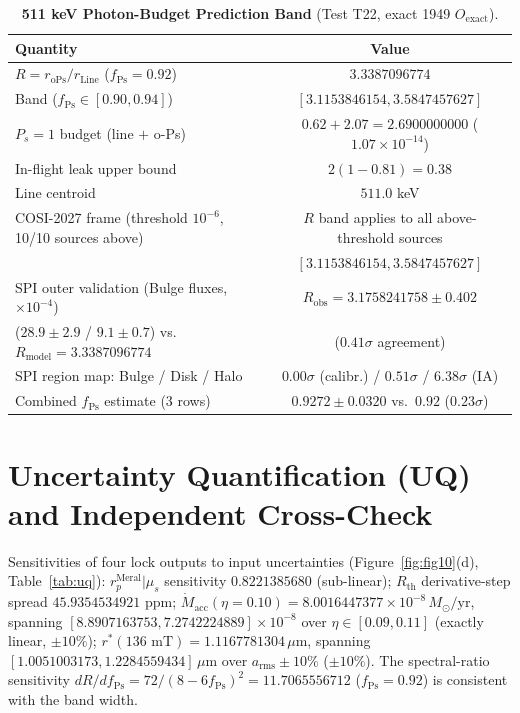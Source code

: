 \documentclass[12pt,a4paper]{article}
\begin{document}
\begin{table}[!htbp]
\centering
\footnotesize
\setlength{\tabcolsep}{3pt}
\caption{\textbf{511 keV Photon-Budget Prediction Band} (Test T22, exact 1949 $O_{\mathrm{exact}}$).}
\label{tab:t22}
\vspace{0.1cm}
\begin{tabular}{@{}l|c@{}}
\hline
Quantity & Value \\
\hline
$R = r_{\mathrm{oPs}}/r_{\mathrm{Line}}$ ($f_{\mathrm{Ps}}=0.92$) & $3.3387096774$ \\
Band ($f_{\mathrm{Ps}}\in[0.90,0.94]$) & $[3.1153846154, 3.5847457627]$ \\
$P_s=1$ budget (line $+$ o-Ps) & $0.62 + 2.07 = 2.6900000000$ ($1.07\times 10^{-14}$) \\
In-flight leak upper bound & $2(1-0.81) = 0.38$ \\
Line centroid & $511.0$ keV \\
COSI-2027 frame (threshold $10^{-6}$, 10/10 sources above) & $R$ band applies to all above-threshold sources \\
& $[3.1153846154, 3.5847457627]$ \\
SPI outer validation (Bulge fluxes, $\times10^{-4}$) & $R_{\mathrm{obs}}=3.1758241758\pm0.402$ \\
($28.9\pm2.9$ / $9.1\pm0.7$) vs.\ $R_{\mathrm{model}}=3.3387096774$ & ($0.41\sigma$ agreement) \\
SPI region map: Bulge / Disk / Halo & $0.00\sigma$ (calibr.) / $0.51\sigma$ / $6.38\sigma$ (IA) \\
Combined $f_{\mathrm{Ps}}$ estimate (3 rows) & $0.9272\pm0.0320$ vs.\ $0.92$ ($0.23\sigma$) \\
\hline
\end{tabular}
\end{table}

\section{Uncertainty Quantification (UQ) and Independent Cross-Check}

Sensitivities of four lock outputs to input uncertainties (Figure~\ref{fig:fig10}(d), Table~\ref{tab:uq}): $r_p^{\mathrm{Meral}}|\mu_s$ sensitivity $0.8221385680$ (sub-linear); $R_{\mathrm{th}}$ derivative-step spread $45.9354534921\text{ ppm}$; $\dot{M}_{\mathrm{acc}}(\eta=0.10)=8.0016447377\times 10^{-8}\,M_\odot\text{/yr}$, spanning $[8.8907163753, 7.2742224889]\times 10^{-8}$ over $\eta\in[0.09,0.11]$ (exactly linear, $\pm 10\%$); $r^*(136\text{ mT})=1.1167781304\,\mu\text{m}$, spanning $[1.0051003173, 1.2284559434]\,\mu\text{m}$ over $a_{\mathrm{rms}}\pm 10\%$ ($\pm 10\%$). The spectral-ratio sensitivity $dR/df_{\mathrm{Ps}} = 72/(8-6f_{\mathrm{Ps}})^2 = 11.7065556712$ ($f_{\mathrm{Ps}}=0.92$) is consistent with the band width.
\end{document}
